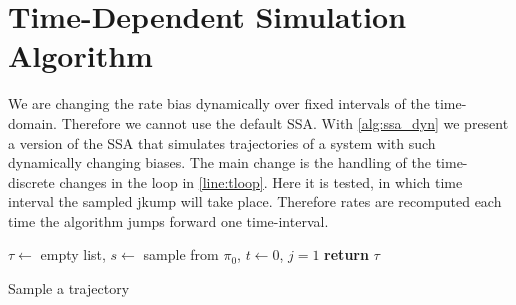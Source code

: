 \section{Time-Dependent Simulation Algorithm}
We are changing the rate bias dynamically over fixed intervals of the time-domain.
Therefore we cannot use the default \ac{SSA}.
With \autoref{alg:ssa_dyn} we present a version of the \acl{SSA} that simulates trajectories of a system with such dynamically changing biases.
The main change is the handling of the time-discrete changes in the loop in \autoref{line:tloop}.
Here it is tested, in which time interval the sampled jkump will take place.
Therefore rates are recomputed each time the algorithm jumps forward one time-interval.
\begin{algorithm}
    $\tau \leftarrow$ empty list, $s\leftarrow$ sample from $\pi_0$, $t\leftarrow 0$, $j=1$\;
     \textbf{return} $\tau$\;
    \caption{\label{alg:ssa_dyn}Sample a trajectory}
\end{algorithm}
